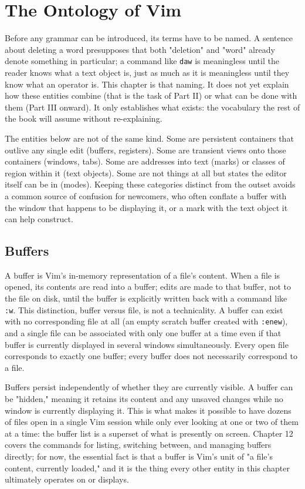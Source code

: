\chapter{The Ontology of Vim}
\label{ch:ontology}

Before any grammar can be introduced, its terms have to be named. A sentence about deleting a word presupposes that both "deletion" and "word" already denote something in particular; a command like \texttt{daw} is meaningless until the reader knows what a text object is, just as much as it is meaningless until they know what an operator is. This chapter is that naming. It does not yet explain how these entities combine (that is the task of Part II) or what can be done with them (Part III onward). It only establishes what exists: the vocabulary the rest of the book will assume without re-explaining.

The entities below are not of the same kind. Some are persistent containers that outlive any single edit (buffers, registers). Some are transient views onto those containers (windows, tabs). Some are addresses into text (marks) or classes of region within it (text objects). Some are not things at all but states the editor itself can be in (modes). Keeping these categories distinct from the outset avoids a common source of confusion for newcomers, who often conflate a buffer with the window that happens to be displaying it, or a mark with the text object it can help construct.

\section{Buffers}

A buffer is Vim's in-memory representation of a file's content. When a file is opened, its contents are read into a buffer; edits are made to that buffer, not to the file on disk, until the buffer is explicitly written back with a command like \texttt{:w}. This distinction, buffer versus file, is not a technicality. A buffer can exist with no corresponding file at all (an empty scratch buffer created with \texttt{:enew}), and a single file can be associated with only one buffer at a time even if that buffer is currently displayed in several windows simultaneously. Every open file corresponds to exactly one buffer; every buffer does not necessarily correspond to a file.

Buffers persist independently of whether they are currently visible. A buffer can be "hidden," meaning it retains its content and any unsaved changes while no window is currently displaying it. This is what makes it possible to have dozens of files open in a single Vim session while only ever looking at one or two of them at a time: the buffer list is a superset of what is presently on screen. Chapter 12 covers the commands for listing, switching between, and managing buffers directly; for now, the essential fact is that a buffer is Vim's unit of "a file's content, currently loaded," and it is the thing every other entity in this chapter ultimately operates on or displays.

